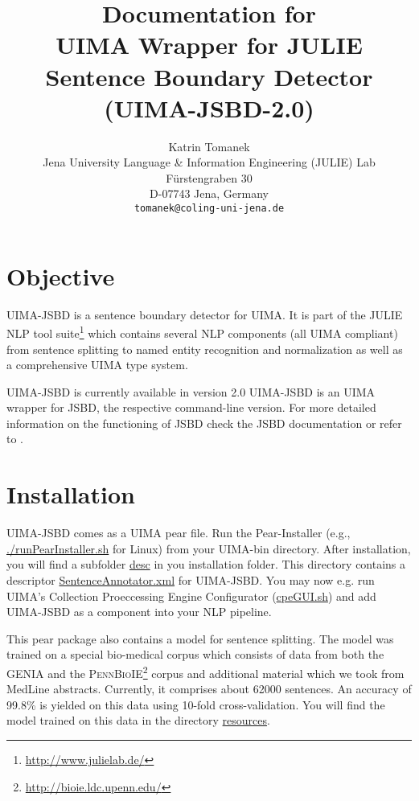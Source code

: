 \documentclass[11pt,a4paper,halfparskip]{scrartcl}
\title{\small{Documentation for}\\\huge UIMA Wrapper for JULIE Sentence Boundary Detector
  (UIMA-JSBD-2.0)}
\author{\normalsize Katrin Tomanek\\
  \normalsize  Jena University Language \& Information Engineering (JULIE) Lab\\
  \normalsize F\"urstengraben 30 \\
  \normalsize D-07743 Jena, Germany\\
  {\normalsize \tt tomanek@coling-uni-jena.de} }
\date{}
\begin{document}
\maketitle

\section{Objective}

UIMA-JSBD is a sentence boundary detector for UIMA.  It is part of
the JULIE NLP tool suite\footnote{\url{http://www.julielab.de/}} which
contains several NLP components (all UIMA compliant) from sentence
splitting to named entity recognition and normalization as well as a
comprehensive UIMA type system.

UIMA-JSBD is currently available in version 2.0 UIMA-JSBD is an UIMA
wrapper for JSBD, the respective command-line version. For more
detailed information on the functioning of JSBD check the JSBD
documentation or refer to \cite{Tomanek2007a}.

\section{Installation}

UIMA-JSBD comes as a UIMA pear file. Run the Pear-Installer (e.g.,
\url{./runPearInstaller.sh} for Linux) from your UIMA-bin directory.
After installation, you will find a subfolder \url{desc} in you
installation folder. This directory contains a descriptor
\url{SentenceAnnotator.xml} for UIMA-JSBD. You may now e.g. run UIMA's
Collection Proeccessing Engine Configurator (\url{cpeGUI.sh}) and add
UIMA-JSBD as a component into your NLP pipeline.

This pear package also contains a model for sentence splitting. The
model was trained on a special bio-medical corpus which consists of
data from both the GENIA \cite{Ohta2002} and the
\textsc{PennBioIE}\footnote{\url{http://bioie.ldc.upenn.edu/}} corpus
and additional material which we took from MedLine abstracts.
Currently, it comprises about 62000 sentences. An accuracy of 99.8\%
is yielded on this data using 10-fold cross-validation.  You will find
the model trained on this data in the directory \url{resources}.



\end{document}

